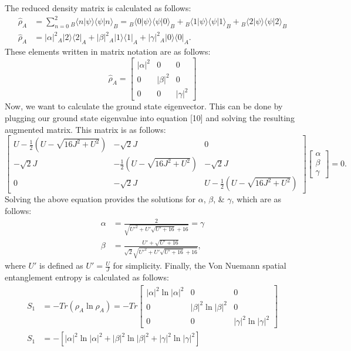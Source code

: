 \noindent The reduced density matrix is calculated as follows:
\begin{align}
\hat{\rho}_A &= \sum_{n=0}^{2}{{}_B \langle n | \psi \rangle \langle \psi | n \rangle_B} = {}_B \langle 0 | \psi \rangle \langle \psi | 0 \rangle_B + {}_B \langle 1 | \psi \rangle \langle \psi | 1 \rangle_B + {}_B \langle 2 | \psi \rangle \langle \psi | 2 \rangle_B \\
\hat{\rho}_A &=|\alpha|^2 {}_A |2\rangle\langle2|_A + |\beta|^2 {}_A |1\rangle\langle1|_A + |\gamma|^2 {}_A |0\rangle\langle0|_A.
\end{align}
\noindent These elements written in matrix notation are as follows:
\begin{equation}
\hat{\rho}_A = \begin{bmatrix} |\alpha|^2 & 0 & 0 \\ 0 & |\beta|^2 & 0 \\ 0 & 0 & |\gamma|^2 \end{bmatrix}
\end{equation}
\noindent Now, we want to calculate the ground state eigenvector. This can be done by plugging our ground state eigenvalue into equation [10] and solving the resulting augmented matrix. This matrix is as follows:
\begin{equation}
\begin{bmatrix} U - \frac{1}{2} \left( U - \sqrt{16J^2 + U^2} \right) & -\sqrt{2}J & 0 \\ -\sqrt{2}J & -\frac{1}{2} \left( U - \sqrt{16J^2 + U^2} \right) & -\sqrt{2}J \\ 0 & -\sqrt{2}J & U - \frac{1}{2} \left( U - \sqrt{16J^2 + U^2} \right) \end{bmatrix} \begin{bmatrix} \alpha \\ \beta \\ \gamma \end{bmatrix} = 0.
\end{equation}
\noindent Solving the above equation provides the solutions for $\alpha$, $\beta$, \& $\gamma$, which are as follows:
\begin{align*}
\alpha &= \frac{2}{\sqrt{ U'^2 + U' \sqrt{U' + 16} + 16}} = \gamma \\
\beta &= \frac{U' + \sqrt{U' + 16}}{\sqrt{2}\sqrt{U'^2 + U' \sqrt{U' + 16} + 16}},
\end{align*}
\noindent where $U'$ is defined as $U' = \frac{U}{J}$ for simplicity. Finally, the Von Nuemann spatial entanglement entropy is calculated as follows:
\begin{align}
S_1 &= -Tr \left( \rho_A \ln{\rho_A} \right) = -Tr \begin{bmatrix} |\alpha|^2 \ln{|\alpha|^2} & 0 & 0 \\ 0 & |\beta|^2 \ln{|\beta|^2} & 0 \\ 0 & 0 & |\gamma|^2 \ln{|\gamma|^2} \end{bmatrix} \\
S_1 &= -\left[ |\alpha|^2 \ln{|\alpha|^2} + |\beta|^2 \ln{|\beta|^2} + |\gamma|^2 \ln{|\gamma|^2} \right]
\end{align}
